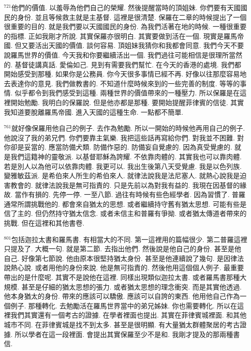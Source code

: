 \documentclass{book}
\begin{document}
$^{721}$他們的價值.
以羞辱為他們自己的榮耀.
然後提醒當時的頂姐妹.
你們要有天國國民的身份.
並且等候救主就是主基督.
這裡是很清楚.
保羅在二章的時候提出了一個很重要的目的.
就是我們要以天國國民的身份.
為我們活著在地的時候.
一種很重要的指標.
正如我剛才所說.
其實保羅亦很明白.
其實要做到活在一個.
現實是羅馬帝國.
但又要活出天國的價值.
談何容易.
頂姐妹我猜你和我都會同意.
我們今天不要說羅馬世界的價值.
今天我和你要繼續活出一個.
我們過往可能相信是很理所當然的.
基督徒講真話.
愛倫如己.
見到有需要我們幫忙.
在今天的香港的處境.
我們都開始感受到那種.
如果你是公務員.
你今天很多事情已經不再.
好像以往那麼容易地去表達你的意見.
我們做教書的.
不知道什麼時候來到的一些完善的制度.
等等的事情.
似乎都令到我們感受到這種.
兩種世界的價值帶來的一種壓力.
所以保羅是在這裡開始勉勵.
我明白的保羅說.
但是他亦都是那種.
要開始提醒菲律賓的信徒.
其實我知道要脫離羅馬帝國.
進入天國的這種生命.
一點都不簡單.

$^{761}$就好像保羅用他自己的例子.
去作為勉勵.
所以一開始的時候他再用自己的例子.
他說沒了我的弟兄們.
你們要靠主氣樂.
我把這些話再寫給你們.
對我並不困難.
對你卻是妥當的.
應當防備犬類.
防備作惡的.
防備妄自覺慮的.
因為真受覺慮的.
就是我們這籍神的靈敬派.
以基督耶穌為誇耀.
不依靠肉體的.
其實我也可以靠肉體.
若是別人以為他可以依靠肉體.
我更可以.
我出生後第八天受覺慮.
我是以色列族.
變雅敏茲派.
是希伯來人所生的希伯來人.
就律法說我是法尼塞人.
就熱心說我是迫害教會的.
就律法說我是無可指責的.
只是先前以為對我有益的.
我現在因基督的緣故.
當作有損的.
先停一停.
一至八節.
過往有時候有些色經學者.
因為習慣了.
普羅通常所謂挑戰他的.
都會來自猶太的思想.
或者繼續持守舊有猶太思想.
可能有些是信了主的.
但仍然持守猶太信念.
或者未信主和普羅有爭拗.
或者猶太傳道者帶來的挑戰.
但在這裡和其他書卷.

$^{801}$包括迦拉太書和羅馬書.
有相當大的不同.
第一這裡用的篇幅很少.
第二普羅這裡只提及了.
大概一句.
就是第二節.
去指出他們.
然後說是他自己的身份.
甚至是他自己.
好像第七節說.
他由原本很堅持猶太身份.
甚至是他連續說了幾句.
是因律法說熱心說.
或者用他的身份來說.
他是無可指責的.
然後他用這個個人例子.
最重要帶出的是什麼呢.
其實不是說他在這裡.
同樣出現類似迦拉太書.
或者羅馬書那種大規模.
甚至是仔細的猶太思想的張力.
或者猶太思想的理念衝突.
而是其實他透過.
他本身猶太的身份.
帶來的應該可以驕傲.
應該可以自誇的東西.
他用他自己作為一個例子.
那種轉化.
去勉勵活在羅馬世界當中的弟兄姊妹.
你也需要轉化.
所以在這裡我們其實還有一個考古的證據.
在學者裡面也提出.
其實在菲律賓城裡面.
和其他城市不同.
在菲律賓城是找不到太多.
甚至是很明顯.
有大量猶太群體聚居的考古證據.
所以學者在這一段裡面.
會提出其實保羅至少不是和.
我剛才提及的那兩種書信.
\end{document}
